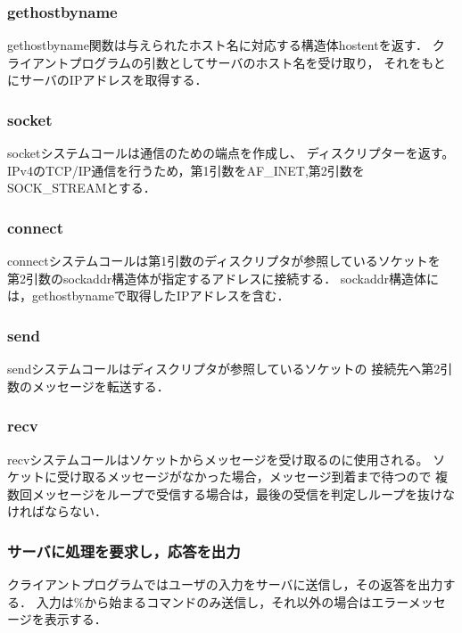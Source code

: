 \documentclass[11pt]{jarticle}
\begin{document}
\subsubsection{gethostbyname}

gethostbyname関数は与えられたホスト名に対応する構造体hostentを返す．
クライアントプログラムの引数としてサーバのホスト名を受け取り，
それをもとにサーバのIPアドレスを取得する．

\subsubsection{socket}

socketシステムコールは通信のための端点を作成し、 ディスクリプターを返す。
IPv4のTCP/IP通信を行うため，第1引数をAF\_INET,第2引数をSOCK\_STREAMとする．

\subsubsection{connect}

connectシステムコールは第1引数のディスクリプタが参照しているソケットを
第2引数のsockaddr構造体が指定するアドレスに接続する．
sockaddr構造体には，gethostbynameで取得したIPアドレスを含む．

\subsubsection{send}

sendシステムコールはディスクリプタが参照しているソケットの
接続先へ第2引数のメッセージを転送する．

\subsubsection{recv}

recvシステムコールはソケットからメッセージを受け取るのに使用される。
ソケットに受け取るメッセージがなかった場合，メッセージ到着まで待つので
複数回メッセージをループで受信する場合は，最後の受信を判定しループを抜けなければならない．

\subsubsection{サーバに処理を要求し，応答を出力}

クライアントプログラムではユーザの入力をサーバに送信し，その返答を出力する．
入力は\%から始まるコマンドのみ送信し，それ以外の場合はエラーメッセージを表示する．
\end{document}
